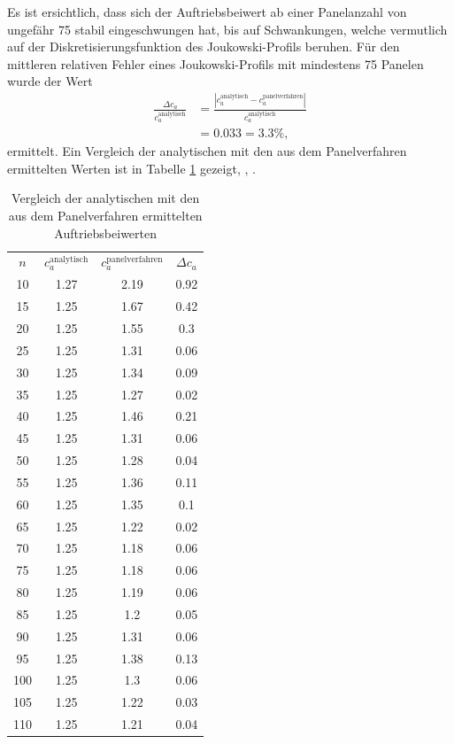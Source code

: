 Es ist ersichtlich, dass sich der Auftriebsbeiwert ab einer Panelanzahl von ungefähr 75 stabil eingeschwungen hat, bis auf Schwankungen, welche vermutlich auf der Diskretisierungsfunktion des Joukowski-Profils beruhen. Für den mittleren relativen Fehler eines Joukowski-Profils mit mindestens 75 Panelen wurde der Wert
\begin{align*}
\frac{\Delta c_a}{c_a^\mathrm{analytisch}} &= \frac{|c_a^\mathrm{analytisch} - c_a^\mathrm{panelverfahren}|}{c_a^\mathrm{analytisch}} \\
& = 0.033 = 3.3 \%,
\end{align*}
ermittelt. Ein Vergleich der analytischen mit den aus dem Panelverfahren ermittelten Werten ist in Tabelle \ref{tab:compjouk} gezeigt, \cite{Abello2018},  \cite{Barba:2019}.

\begin{table}
\caption{Vergleich der analytischen mit den aus dem Panelverfahren ermittelten Auftriebsbeiwerten}
\label{tab:compjouk}
\begin{center}
\begin{tabular}{c|ccc}
    $n$ & $c_a^{\mathrm{analytisch}}$ & $c_a^{\mathrm{panelverfahren}}$ & $\Delta c_a$ \\
10 & 1.27 & 2.19 & 0.92\\
15 & 1.25 & 1.67 & 0.42\\
20 & 1.25 & 1.55 & 0.3\\
25 & 1.25 & 1.31 & 0.06\\
30 & 1.25 & 1.34 & 0.09\\
35 & 1.25 & 1.27 & 0.02\\
40 & 1.25 & 1.46 & 0.21\\
45 & 1.25 & 1.31 & 0.06\\
50 & 1.25 & 1.28 & 0.04\\
55 & 1.25 & 1.36 & 0.11\\
60 & 1.25 & 1.35 & 0.1\\
65 & 1.25 & 1.22 & 0.02\\
70 & 1.25 & 1.18 & 0.06\\
75 & 1.25 & 1.18 & 0.06\\
80 & 1.25 & 1.19 & 0.06\\
85 & 1.25 & 1.2 & 0.05\\
90 & 1.25 & 1.31 & 0.06\\
95 & 1.25 & 1.38 & 0.13\\
100 & 1.25 & 1.3 & 0.06\\
105 & 1.25 & 1.22 & 0.03\\
110 & 1.25 & 1.21 & 0.04\\

\end{tabular}
\end{center}
\end{table}
